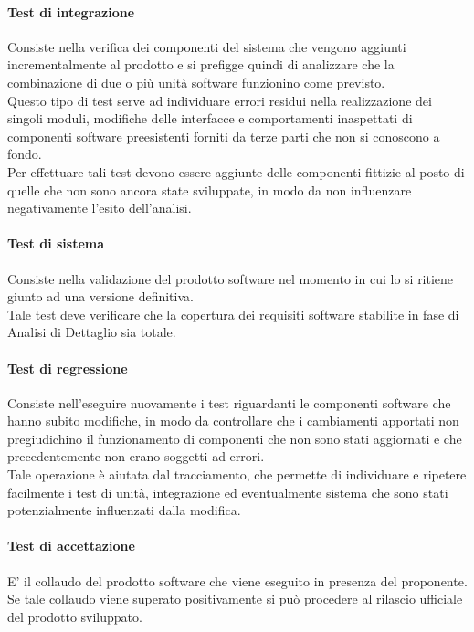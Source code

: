 \paragraph{Test di integrazione}
Consiste nella verifica dei componenti del sistema che vengono aggiunti incrementalmente al prodotto e si prefigge quindi di analizzare che la combinazione di due o più unità software funzionino come previsto.\\
Questo tipo di test serve ad individuare errori residui nella realizzazione dei singoli moduli, modifiche delle interfacce e comportamenti inaspettati di componenti software preesistenti forniti da terze parti che non si conoscono a fondo.\\
Per effettuare tali test devono essere aggiunte delle componenti fittizie al posto di quelle che non sono ancora state sviluppate, in modo da non influenzare negativamente l'esito dell'analisi.

\paragraph{Test di sistema}
Consiste nella validazione del prodotto software nel momento in cui lo si ritiene giunto ad una versione definitiva.\\
Tale test deve verificare che la copertura dei requisiti software stabilite in fase di Analisi di Dettaglio sia totale.

\paragraph{Test di regressione}
Consiste nell'eseguire nuovamente i test riguardanti le componenti software che hanno subito modifiche, in modo da controllare che i cambiamenti apportati non pregiudichino il funzionamento di componenti che non sono stati aggiornati e che precedentemente non erano soggetti ad errori.\\
Tale operazione è aiutata dal tracciamento, che permette di individuare e ripetere facilmente i test di unità, integrazione ed eventualmente sistema che sono stati potenzialmente influenzati dalla modifica.

\paragraph{Test di accettazione}
E' il collaudo del prodotto software che viene eseguito in presenza del proponente. Se tale collaudo viene superato positivamente si può procedere al rilascio ufficiale del prodotto sviluppato.

